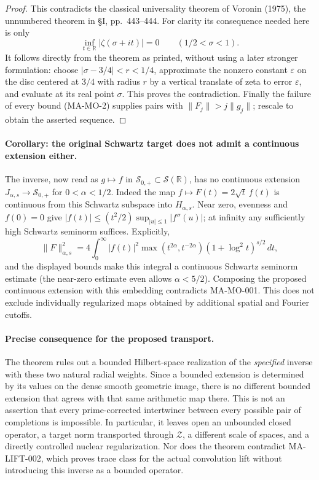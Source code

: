 \begin{proof}
This contradicts the classical universality theorem of Voronin
(1975), the unnumbered theorem in \S I, pp.~443--444.
For clarity its consequence needed here is only
\[
       \inf_{t\in\mathbb R}|\zeta(\sigma+it)|=0
                    \qquad(1/2<\sigma<1).
\]
It follows directly from the theorem as printed, without using
a later stronger formulation: choose
$|\sigma-3/4|<r<1/4$, approximate the nonzero constant
$\varepsilon$ on the disc centered at $3/4$ with radius $r$
by a vertical translate of zeta to error $\varepsilon$, and
evaluate at its real point $\sigma$.
This proves the contradiction. Finally the failure of every
bound (MA-MO-2) supplies pairs with
$\|F_j\|>j\|g_j\|$; rescale to obtain the asserted sequence.
\end{proof}

\paragraph{Corollary: the original Schwartz target does not admit a continuous extension either.}
The inverse, now read as $g\mapsto f$ in
$\mathscr S_{0,+}\subset\mathscr S(\mathbb R)$, has no continuous
extension $J_{\alpha,s}\to\mathscr S_{0,+}$ for
$0<\alpha<1/2$. Indeed the map
$f\mapsto F(t)=2\sqrt t\,f(t)$ is continuous from this Schwartz
subspace into $H_{\alpha,s}$. Near zero, evenness and $f(0)=0$
give $|f(t)|\le(t^2/2)\sup_{|u|\le1}|f''(u)|$; at infinity
any sufficiently high Schwartz seminorm suffices. Explicitly,
\[
 \|F\|_{\alpha,s}^2
 =4\int_0^\infty |f(t)|^2
       \max(t^{2\alpha},t^{-2\alpha})
                    (1+\log^2t)^{s/2}\,dt,
\]
and the displayed bounds make this integral a continuous
Schwartz seminorm estimate (the near-zero estimate even allows
$\alpha<5/2$). Composing the proposed continuous extension
with this embedding contradicts MA-MO-001. This does not
exclude individually regularized maps obtained by additional
spatial and Fourier cutoffs.

\paragraph{Precise consequence for the proposed transport.}
The theorem rules out a bounded Hilbert-space realization of
the \emph{specified} inverse with these two natural radial
weights. Since a bounded extension is determined by its values
on the dense smooth geometric image, there is no different
bounded extension that agrees with that same arithmetic map
there. This is not an assertion that every prime-corrected
intertwiner between every possible pair of completions is
impossible. In particular, it leaves open an unbounded closed
operator, a target norm transported through $\mathcal Z$, a
different scale of spaces, and a directly controlled nuclear
regularization. Nor does the theorem contradict MA-LIFT-002,
which proves trace class for the actual convolution lift
without introducing this inverse as a bounded operator.


